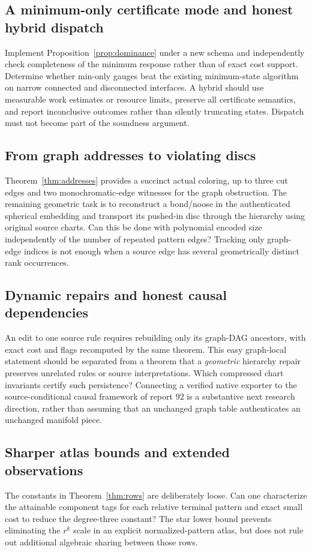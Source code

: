 \documentclass[11pt,letterpaper]{article}
\theoremstyle{definition}
\theoremstyle{remark}\newtheorem{remark}[theorem]{Remark}
\begin{document}
\subsection{A minimum-only certificate mode and honest hybrid dispatch}
Implement Proposition~\ref{prop:dominance} under a new schema and independently check completeness of the minimum response rather than of exact cost support. Determine whether min-only gauges beat the existing minimum-state algorithm on narrow connected and disconnected interfaces. A hybrid should use measurable work estimates or resource limits, preserve all certificate semantics, and report inconclusive outcomes rather than silently truncating states. Dispatch must not become part of the soundness argument.

\subsection{From graph addresses to violating discs}
Theorem~\ref{thm:addresses} provides a succinct actual coloring, up to three cut edges and two monochromatic-edge witnesses for the graph obstruction. The remaining geometric task is to reconstruct a bond/noose in the authenticated spherical embedding and transport its pushed-in disc through the hierarchy using original source charts. Can this be done with polynomial encoded size independently of the number of repeated pattern edges? Tracking only graph-edge indices is not enough when a source edge has several geometrically distinct rank occurrences.

\subsection{Dynamic repairs and honest causal dependencies}
An edit to one source rule requires rebuilding only its graph-DAG ancestors, with exact cost and flags recomputed by the same theorem. This easy graph-local statement should be separated from a theorem that a \emph{geometric} hierarchy repair preserves unrelated rules or source interpretations. Which compressed chart invariants certify such persistence? Connecting a verified native exporter to the source-conditional causal framework of report 92 is a substantive next research direction, rather than assuming that an unchanged graph table authenticates an unchanged manifold piece.

\subsection{Sharper atlas bounds and extended observations}
The constants in Theorem~\ref{thm:rows} are deliberately loose. Can one characterize the attainable component tags for each relative terminal pattern and exact small cost to reduce the degree-three constant? The star lower bound prevents eliminating the $r^k$ scale in an explicit normalized-pattern atlas, but does not rule out additional algebraic sharing between those rows.
\end{document}

